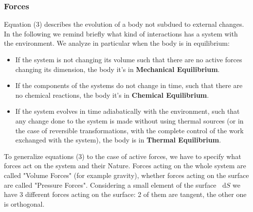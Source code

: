 \documentclass{article}
\newcommand*\diff{\mathop{}\!\mathrm{d}}
\begin{document}
\subsubsection{Forces}
Equation (3) describes the evolution of a body not subdued to external changes. In the following we remind briefly what kind of interactions has a system with the environment. We analyze in particular when the body is in equilibrium:
\begin{itemize}
        \item  If the system is not changing its volume such that there are no active forces changing its dimension, the body it's in \textbf{Mechanical Equilibrium}.
        \item  If the components of the systems do not change in time, such that there are no chemical reactions, the body it's in \textbf{Chemical Equilibrium}.
        \item If the system evolves in time adiabatically with the environment, such that any change done to the system is made without using thermal sources (or in the case of reversible transformations, with the complete control of the work exchanged with the system), the body is in \textbf{Thermal Equilibrium}.
\end{itemize}
To generalize equations (3) to the case of active forces, we have to specify what forces act on the system and their Nature. Forces acting on the whole system are called "Volume Forces" (for example gravity), whether forces acting on the surface are called "Pressure Forces". Considering a small element of the surface $\diff{S}$ we have 3 different forces acting on the surface: 2 of them are tangent, the other one is orthogonal. 
\end{document}
